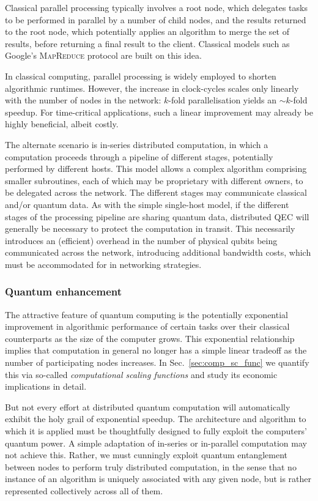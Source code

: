 Classical parallel processing typically involves a root node, which delegates tasks to be performed in parallel by a number of child nodes, and the results returned to the root node, which potentially applies an algorithm to merge the set of results, before returning a final result to the client. Classical models such as Google's \textsc{MapReduce} protocol \cite{bib:MapReduce} are built on this idea.

In classical computing, parallel processing is widely employed to shorten algorithmic runtimes. However, the increase in clock-cycles scales only linearly with the number of nodes in the network: $k$-fold parallelisation yields an \mbox{$\sim k$}-fold speedup. For time-critical applications, such a linear improvement may already be highly beneficial, albeit costly.

The alternate scenario is in-series distributed computation, in which a computation proceeds through a pipeline of different stages, potentially performed by different hosts. This model allows a complex algorithm comprising smaller subroutines, each of which may be proprietary with different owners, to be delegated across the network. The different stages may communicate classical and/or quantum data. As with the simple single-host model, if the different stages of the processing pipeline are sharing quantum data, distributed QEC will generally be necessary to protect the computation in transit. This necessarily introduces an (efficient) overhead in the number of physical qubits being communicated across the network, introducing additional bandwidth costs, which must be accommodated for in networking strategies.

\subsubsection{Quantum enhancement}

The attractive feature of quantum computing is the potentially exponential improvement in algorithmic performance of certain tasks over their classical counterparts as the size of the computer grows. This exponential relationship implies that computation in general no longer has a simple linear tradeoff as the number of participating nodes increases. In Sec.~\ref{sec:comp_sc_func} we quantify this via so-called \textit{computational scaling functions} and study its economic implications in detail.

But not every effort at distributed quantum computation will automatically exhibit the holy grail of exponential speedup. The architecture and algorithm to which it is applied must be thoughtfully designed to fully exploit the computers' quantum power. A simple adaptation of in-series or in-parallel computation may not achieve this. Rather, we must cunningly exploit quantum entanglement between nodes to perform truly distributed computation, in the sense that no instance of an algorithm is uniquely associated with any given node, but is rather represented collectively across all of them.

